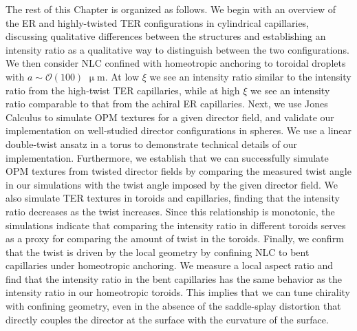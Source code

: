 The rest of this Chapter is organized as follows.
We begin with an overview of the ER and highly-twisted TER configurations in cylindrical capillaries, discussing qualitative differences between the structures and establishing an intensity ratio as a qualitative way to distinguish between the two configurations.
We then consider NLC confined with homeotropic anchoring to toroidal droplets with $a \sim \mathcal{O}(100)$ $\upmu$m.
At low $\xi$ we see an intensity ratio similar to the intensity ratio from the high-twist TER capillaries, while at high $\xi$ we see an intensity ratio comparable to that from the achiral ER capillaries.
Next, we use Jones Calculus to simulate OPM textures for a given director field, and validate our implementation on well-studied director configurations in spheres.
We use a linear double-twist ansatz in a torus to demonstrate technical details of our implementation.
Furthermore, we establish that we can successfully simulate OPM textures from twisted director fields by comparing the measured twist angle in our simulations with the twist angle imposed by the given director field.
We also simulate TER textures in toroids and capillaries, finding that the intensity ratio decreases as the twist increases.
Since this relationship is monotonic, the simulations indicate that comparing the intensity ratio in different toroids serves as a proxy for comparing the amount of twist in the toroids.
Finally, we confirm that the twist is driven by the local geometry by confining NLC to bent capillaries under homeotropic anchoring.
We measure a local aspect ratio and find that the intensity ratio in the bent capillaries has the same behavior as the intensity ratio in our homeotropic toroids.
This implies that we can tune chirality with confining geometry, even in the absence of the saddle-splay distortion that directly couples the director at the surface with the curvature of the surface.




